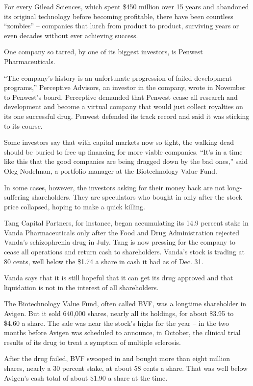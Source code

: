 \documentclass[12pt,a4paper,onecolumn]{article}
\begin{document}
\begin{CJK*}{GBK}{song}
For every Gilead Sciences, which spent \$450 million over 15 years and abandoned its original
technology before becoming profitable, there have been countless ``zombies'' -- companies that lurch
from product to product, surviving years or even decades without ever achieving success.

One company so tarred, by one of its biggest investors, is Penwest Pharmaceuticals.

``The company's history is an unfortunate progression of failed development programs,'' Perceptive
Advisors, an investor in the company, wrote in November to Penwest's board. Perceptive demanded that
Penwest cease all research and development and become a virtual company that would just collect
royalties on its one successful drug. Penwest defended its track record and said it was sticking to
its course.

Some investors say that with capital markets now so tight, the walking dead should be buried to free
up financing for more viable companies. ``It's in a time like this that the good companies are being
dragged down by the bad ones,'' said Oleg Nodelman, a portfolio manager at the Biotechnology Value
Fund.

In some cases, however, the investors asking for their money back are not long-suffering
shareholders. They are speculators who bought in only after the stock price collapsed, hoping to
make a quick killing.

Tang Capital Partners, for instance, began accumulating its 14.9 percent stake in Vanda
Pharmaceuticals only after the Food and Drug Administration rejected Vanda's schizophrenia drug in
July. Tang is now pressing for the company to cease all operations and return cash to shareholders.
Vanda's stock is trading at 80 cents, well below the \$1.74 a share in cash it had as of Dec. 31.

Vanda says that it is still hopeful that it can get its drug approved and that liquidation is not in
the interest of all shareholders.

The Biotechnology Value Fund, often called BVF, was a longtime shareholder in Avigen. But it sold
640,000 shares, nearly all its holdings, for about \$3.95 to \$4.60 a share. The sale was near the
stock's highs for the year -- in the two months before Avigen was scheduled to announce, in October,
the clinical trial results of its drug to treat a symptom of multiple sclerosis.

After the drug failed, BVF swooped in and bought more than eight million shares, nearly a 30 percent
stake, at about 58 cents a share. That was well below Avigen's cash total of about \$1.90 a share at
the time.


\end{CJK*}
\end{document}
